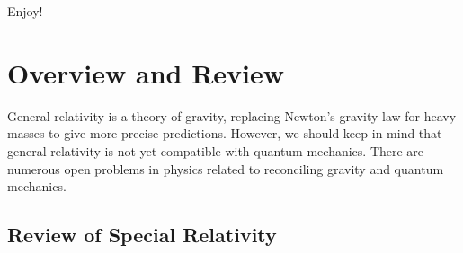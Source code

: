 \documentclass{book}
\theoremstyle{definition}
\begin{document}
Enjoy!

\newpage
\tableofcontents
\newpage



\chapter{Overview and Review}

General relativity is a theory of gravity, replacing Newton's gravity law for heavy masses to give more precise predictions. However, we should keep in mind that general relativity is not yet compatible with quantum mechanics. There are numerous open problems in physics related to reconciling gravity and quantum mechanics. 

\section{Review of Special Relativity}
\end{document}
